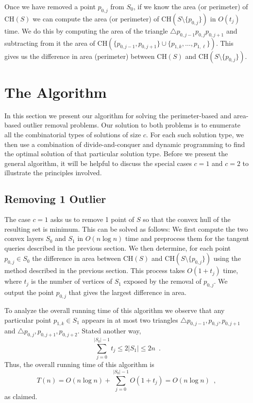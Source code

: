 \documentclass[lotsofwhite]{patmorin}
\newcommand{\ch}{\mathrm{CH}}
\begin{document}
Once we have removed a point $p_{0,j}$ from $S_0$, if we know the area
(or perimeter) of $\ch(S)$ we can compute the area (or perimeter) of
$\ch(S\setminus\{p_{0,j}\})$ in $O(t_j)$ time.  We do this by
computing the area of the triangle $\triangle
p_{0,j-1}p_{0,j}p_{0,j+1}$ and subtracting from it the area of
$\ch(\{p_{0,j-1},p_{0,j+1}\}\cup\{p_{1,k},\ldots,p_{1,\ell}\})$.  This
gives us the difference in area (perimeter) between $\ch(S)$ and
$\ch(S\setminus\{p_{0,j}\})$.


\section{The Algorithm}

In this section we present our algorithm for solving the
perimeter-based and area-based outlier removal problems. Our solution
to both problems is to enumerate all the combinatorial types of
solutions of size $c$.  For each such solution type, we then use a
combination of divide-and-conquer and dynamic programming to find the
optimal solution of that particular solution type.  Before we present
the general algorithm, it will be helpful to discuss the special cases
$c=1$ and $c=2$ to illustrate the principles involved.

\subsection{Removing 1 Outlier}

The case $c=1$ asks us to remove 1 point of $S$ so that the convex
hull of the resulting set is minimum.  This can be solved as follows:
We first compute the two convex layers $S_0$ and $S_1$ in $O(n\log n)$
time and preprocess them for the tangent queries described in the
previous section.  We then determine, for each point $p_{0,j}\in S_0$
the difference in area between $\ch(S)$ and
$\ch(S\setminus\{p_{0,j}\})$ using the method described in the
previous section.  This process takes $O(1+t_j)$ time, where $t_j$ is
the number of vertices of $S_1$ exposed by the removal of $p_{0,j}$.
We output the point $p_{0,j}$ that gives the largest difference in
area.

To analyze the overall running time of this algorithm we observe that
any particular point $p_{1,k}\in S_1$ appears in at most two triangles
$\triangle p_{0,j-1},p_{0,j},p_{0,j+1}$ and
$\triangle p_{0,j},p_{0,j+1},p_{0,j+2}$.  Stated another way,
\[
     \sum_{j=0}^{|S_0|-1} t_j \le 2|S_1|\le 2n \enspace .
\]
Thus, the overall running time of this algorithm is
\[
     T(n) = O(n\log n)+\sum_{j=0}^{|S_0|-1} O(1+t_j) = O(n\log n) \enspace ,
\]
as claimed.
\end{document}
